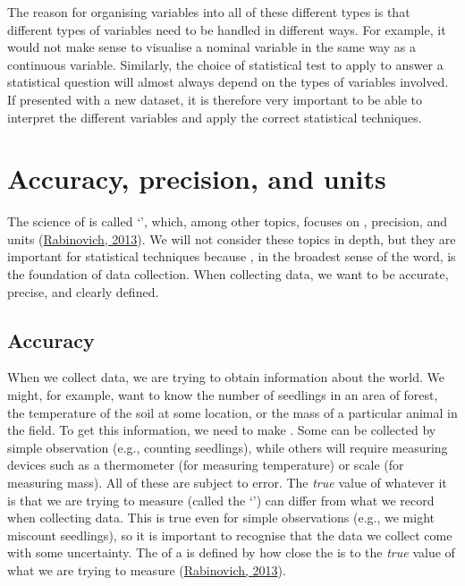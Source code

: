 \documentclass[
  openany]{krantz}
\begin{document}
The reason for organising variables into all of these different types is that different types of variables need to be handled in different ways.
For example, it would not make sense to visualise a nominal variable in the same way as a continuous variable.
Similarly, the choice of statistical test to apply to answer a statistical question will almost always depend on the types of variables involved.
If presented with a new dataset, it is therefore very important to be able to interpret the different variables and apply the correct statistical techniques.

\hypertarget{Chapter_6}{%
\chapter{Accuracy, precision, and units}\label{Chapter_6}}

The science of  is called `', which, among other topics, focuses on  , precision, and units (\protect\hyperlink{ref-Rabinovich2013}{Rabinovich, 2013}).
We will not consider these topics in depth, but they are important for statistical techniques because , in the broadest sense of the word, is the foundation of data collection.
When collecting data, we want  to be accurate, precise, and clearly defined.

\hypertarget{accuracy}{%
\section{Accuracy}\label{accuracy}}

When we collect data, we are trying to obtain information about the world.
We might, for example, want to know the number of seedlings in an area of forest, the temperature of the soil at some location, or the mass of a particular animal in the field.
To get this information, we need to make .
Some  can be collected by simple observation (e.g., counting seedlings), while others will require measuring devices such as a thermometer (for measuring temperature) or scale (for measuring mass).
All of these  are subject to error.
The \emph{true} value of whatever it is that we are trying to measure (called the `') can differ from what we record when collecting data.
This is true even for simple observations (e.g., we might miscount seedlings), so it is important to recognise that the data we collect come with some uncertainty.
The \textbf{} of a  is defined by how close the  is to the \emph{true} value of what we are trying to measure (\protect\hyperlink{ref-Rabinovich2013}{Rabinovich, 2013}).
\end{document}
